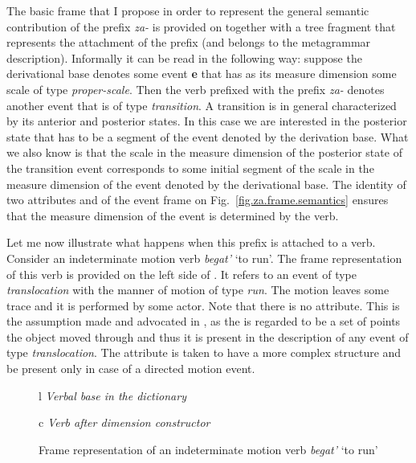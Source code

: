 The basic frame that I propose in order to represent the general semantic contribution of the prefix \textit{za-} is provided on  together with a tree fragment that represents the attachment of the prefix (and belongs to the metagrammar description). Informally it can be read in the following way: suppose the derivational base denotes some event \textbf{e} that has as its measure dimension some scale of type \textit{proper-scale}. Then the verb prefixed with the prefix \textit{za-} denotes another event that is of type \textit{transition}. A transition is in general characterized by its anterior and posterior states. In this case we are interested in the posterior state that has to be a segment of the event denoted by the derivation base. What we also know is that the scale in the measure dimension of the posterior state of the transition event corresponds to some initial segment of the scale in the measure dimension of the event denoted by the derivational base. The identity of two attributes \VERBDIM and \MDIM of the event frame on Fig.~\ref{fig.za.frame.semantics} ensures that the measure dimension of the event is determined by the verb.

Let me now illustrate what happens when this prefix is attached to a verb. Consider an indeterminate motion verb \textit{begat'} `to run'. The frame representation of this verb is provided on the left side of . It refers to an event of type \textit{translocation} with the manner of motion of type \textit{run}. The motion leaves some trace and it is performed by some actor. Note that there is no \PATH attribute. This is the assumption made and advocated in \citealt{ZinovaOsswald:paper}, as the \TRACE is regarded to be a set of points the object moved through and thus it is present in the description of any event of type \textit{translocation}. The \PATH attribute is taken to have a more complex structure and be present only in case of a directed motion event.

\begin{figure}
\begin{tabular}[t]{l}
\textit{Verbal base in the dictionary}\\
\end{tabular}
\hfill
\begin{tabular}[t]{c}
\textit{Verb after dimension constructor}\\
\end{tabular}
\caption{Frame representation of an indeterminate motion verb \textit{begat'} `to run' \label{frame:begat}}
\end{figure}

